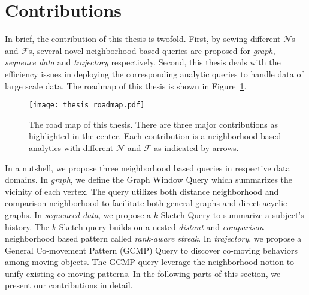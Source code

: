 \section{Contributions}
In brief, the contribution of this thesis is twofold.
First, by sewing different $\mathcal{N}$s and $\mathcal{F}$s, 
several novel neighborhood based queries are proposed for 
\emph{graph}, \emph{sequence data} and \emph{trajectory} respectively. 
Second, this thesis
deals with the efficiency issues in deploying the corresponding analytic queries to
handle data of large scale data.
The roadmap of this thesis is shown in Figure~\ref{fig:thesis_roadmap}.
\begin{figure}[h]
\centering
\texttt{[image: thesis\_roadmap.pdf]}
\caption{The road map of this thesis. There are three major contributions as highlighted in the center. Each contribution
is a neighborhood based analytics with different $\mathcal{N}$ and $\mathcal{F}$ as indicated by arrows.} 
\label{fig:thesis_roadmap}
\end{figure}

In a nutshell, we propose three neighborhood based queries in respective data domains. 
In \emph{graph}, we define the Graph Window Query which summarizes the vicinity of each vertex.
The query utilizes both distance neighborhood and comparison neighborhood to facilitate both
general graphs and direct acyclic graphs.
%
In \emph{sequenced data}, we propose a $k$-Sketch Query to summarize a subject's history. The $k$-Sketch query builds on a nested \emph{distant} and \emph{comparison} neighborhood based pattern called \emph{rank-aware streak}.
%
In \emph{trajectory}, we propose a General Co-movement Pattern (GCMP) Query to discover co-moving behaviors among moving objects. The GCMP query leverage the neighborhood notion to unify existing co-moving patterns.
%
In the following parts of this section, we present our contributions in detail.


